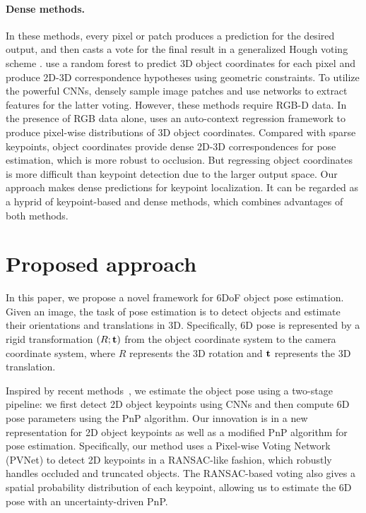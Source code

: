 \documentclass[10pt,twocolumn,letterpaper]{article}
\begin{document}
\paragraph{Dense methods.} In these methods, every pixel or patch produces a prediction for the desired output, and then casts a vote for the final result in a generalized Hough voting scheme \cite{liebelt2008independent, sun2010depth, glasner2011aware}. \cite{brachmann2014learning, michel2017global} use a random forest to predict 3D object coordinates for each pixel and produce 2D-3D correspondence hypotheses using geometric constraints. To utilize the powerful CNNs, \cite{kehl2016deep, doumanoglou2016recovering} densely sample image patches and use networks to extract features for the latter voting. 
However, these methods require RGB-D data. 
In the presence of RGB data alone, \cite{brachmann2016uncertainty} uses an auto-context regression framework \cite{tu2010auto} to produce pixel-wise distributions of 3D object coordinates. 
Compared with sparse keypoints, object coordinates provide dense 2D-3D correspondences for pose estimation, which is more robust to occlusion. But regressing object coordinates is more difficult than keypoint detection due to the larger output space. Our approach makes dense predictions for keypoint localization. It can be regarded as a hyprid of keypoint-based and dense methods, which combines advantages of both methods.
 \section{Proposed approach}



In this paper, we propose a novel framework for 6DoF object pose estimation. Given an image, the task of pose estimation is to detect objects and estimate their orientations and translations in 3D. Specifically, 6D pose is represented by a rigid transformation $(R; {\bf t})$ from the object coordinate system to the camera coordinate system, where $R$ represents the 3D rotation and $\bf t$ represents the 3D translation.

Inspired by recent methods~\cite{pavlakos20176, rad2017bb8, tekin2018real}, we estimate the object pose using a two-stage pipeline: we first detect 2D object keypoints using CNNs and then compute 6D pose parameters using the PnP algorithm. Our innovation is in a new representation for 2D object keypoints as well as a modified PnP algorithm for pose estimation. Specifically, our method uses a Pixel-wise Voting Network (PVNet) to detect 2D keypoints in a RANSAC-like fashion, which robustly handles occluded and truncated objects. The RANSAC-based voting also gives a spatial probability distribution of each keypoint, allowing us to estimate the 6D pose with an uncertainty-driven PnP.
\end{document}
